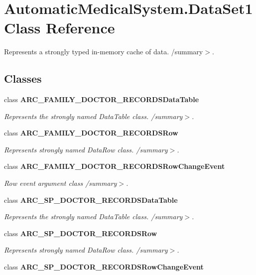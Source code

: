 \section{AutomaticMedicalSystem.DataSet1 Class Reference}
\label{class_automatic_medical_system_1_1_data_set1}
Represents a strongly typed in-memory cache of data. /summary$>$.  


\subsection*{Classes}
\begin{CompactItemize}
\item 
class {\bf ARC\_\-FAMILY\_\-DOCTOR\_\-RECORDSDataTable}
\begin{CompactList}\small\item\em Represents the strongly named DataTable class. /summary$>$. \item\end{CompactList}\item 
class {\bf ARC\_\-FAMILY\_\-DOCTOR\_\-RECORDSRow}
\begin{CompactList}\small\item\em Represents strongly named DataRow class. /summary$>$. \item\end{CompactList}\item 
class {\bf ARC\_\-FAMILY\_\-DOCTOR\_\-RECORDSRowChangeEvent}
\begin{CompactList}\small\item\em Row event argument class /summary$>$. \item\end{CompactList}\item 
class {\bf ARC\_\-SP\_\-DOCTOR\_\-RECORDSDataTable}
\begin{CompactList}\small\item\em Represents the strongly named DataTable class. /summary$>$. \item\end{CompactList}\item 
class {\bf ARC\_\-SP\_\-DOCTOR\_\-RECORDSRow}
\begin{CompactList}\small\item\em Represents strongly named DataRow class. /summary$>$. \item\end{CompactList}\item 
class {\bf ARC\_\-SP\_\-DOCTOR\_\-RECORDSRowChangeEvent}

\end{CompactItemize}
